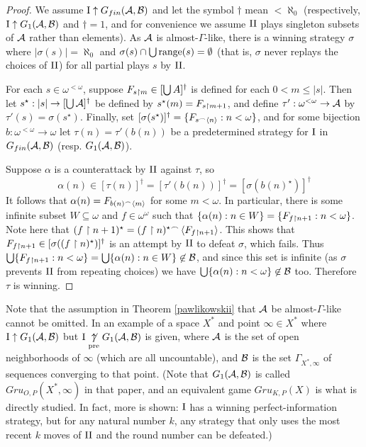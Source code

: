 \documentclass{amsart}
\theoremstyle{plain}
\theoremstyle{definition}
\theoremstyle{remark}
\theoremstyle{plain}
\theoremstyle{definition}
\theoremstyle{remark}
\begin{document}
\begin{proof}
We assume \(\mathrm{I}\uparrow G_{fin}(\mathcal{A},\mathcal{B})\)
and let the symbol \(\dagger\) mean \(<\aleph_0\)
(respectively, \(\mathrm{I}\uparrow G_1(\mathcal{A},\mathcal{B})\)
and \(\dagger=1\),
and for convenience we assume \(\mathrm{II}\) plays
singleton subsets of \(\mathcal{A}\) rather than elements).
As \(\mathcal{A}\) is almost-\(\Gamma\)-like, there is a 
winning strategy \(\sigma\) where
\(|\sigma(s)|=\aleph_0\) and \(\sigma(s)\cap\bigcup\text{range}(s)=\emptyset\)
(that is, \(\sigma\) never replays the choices of \(\mathrm{II}\))
for all partial plays \(s\) by \(\mathrm{II}\).

For each \(s\in\omega^{<\omega}\), suppose 
\(F_{s\restriction m}\in[\bigcup A]^{\dagger}\) 
is defined for each \(0<m\leq|s|\).
Then let \(s^\star:|s|\to[\bigcup\mathcal{A}]^{\dagger}\)
be defined by
\(s^\star(m)=F_{s\restriction m+1}\), and define \(\tau':\omega^{<\omega}\to\mathcal{A}\)
by \(\tau'(s)=\sigma(s^\star)\). Finally, set 
\([\sigma(s^\star)]^{\dagger}=\{F_{s{^\frown}\left\langle n\right\rangle}:n<\omega\}\), and
for some bijection \(b:\omega^{<\omega}\to\omega\) let \(\tau(n)=\tau'(b(n))\)
be a predetermined strategy for \(\mathrm{I}\) in \(G_{fin}(\mathcal{A},\mathcal{B})\)
(resp. \(G_1(\mathcal{A},\mathcal{B})\)).

Suppose \(\alpha\) is a counterattack by \(\mathrm{II}\) against \(\tau\), so 
\[
  \alpha(n)
    \in
  [\tau(n)]^{\dagger}
    =
  [\tau'(b(n))]^{\dagger}
    =
  [\sigma(b(n)^\star)]^{\dagger}
\]
It follows that \(\alpha(n)=F_{b(n){^\frown}\left\langle m\right\rangle}\) for some \(m<\omega\).
In particular, there is some infinite subset \(W\subseteq\omega\) and \(f\in\omega^\omega\)
such that \(\{\alpha(n):n\in W\}=\{F_{f\restriction n+1}:n<\omega\}\).
Note here that \((f\restriction n+1)^\star=(f\restriction n)^\star{^\frown}\left\langle F_{f\restriction n+1}\right\rangle\).
This shows that \(F_{f\restriction n+1}\in[\sigma((f\restriction n)^\star)]^{\dagger}\) 
is an attempt by \(\mathrm{II}\) to defeat \(\sigma\), which fails. Thus 
\(\bigcup\{F_{f\restriction n+1}:n<\omega\}=\bigcup\{\alpha(n):n\in W\}\not\in\mathcal{B}\),
and since this set is infinite (as \(\sigma\) prevents \(\mathrm{II}\)
from repeating choices) we have \(\bigcup\{\alpha(n):n<\omega\}\not\in\mathcal{B}\) too.
Therefore \(\tau\) is winning.
\end{proof}

Note that the assumption in Theorem \ref{pawlikowskii} that \(\mathcal{A}\)
be almost-\(\Gamma\)-like cannot be omitted. In
\cite{MR3467819}
an example of a space \(X^*\) and point \(\infty\in X^*\) 
where \(\mathrm{I}\uparrow G_1(\mathcal{A},\mathcal{B})\) but
\(\mathrm{I}\underset{\text{pre}}{\not\uparrow} G_1(\mathcal{A},\mathcal{B})\) is given, where \(\mathcal{A}\) is
the set of open neighborhoods of \(\infty\) 
(which are all uncountable), 
and \(\mathcal{B}\) is the set \(\Gamma_{X^*,\infty}\) of sequences converging to that point.
(Note that \(G_1(\mathcal{A},\mathcal{B})\) is called \(Gru_{O,P}(X^*,\infty)\) in that
paper, and an equivalent game \(Gru_{K,P}(X)\) is what is directly
studied. In fact, more is shown: \(\mathrm{I}\) has a winning perfect-information
strategy, but for any natural number \(k\), any strategy that only uses 
the most recent \(k\) moves of \(\mathrm{II}\) and the round number
can be defeated.)
\end{document}
